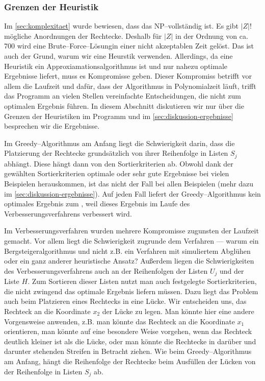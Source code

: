 \subsubsection{Grenzen der Heuristik}\label{sec:diskussion-grenzen}
Im \cref{sec:komplexitaet} wurde bewiesen, dass das \fp{} NP--vollständig ist.
Es gibt $|Z|!$ mögliche Anordnungen der Rechtecke.
Deshalb für $|Z|$ in der Ordnung von ca. 700 wird eine Brute--Force--Lösungin einer nicht
akzeptablen Zeit gelöst.
Das ist auch der Grund, warum wir eine Heurstik verwenden.
Allerdings, da eine Heuristik ein Approxiamationsalgorithmus ist und
nur nahezu optimale Ergebnisse liefert, muss es Kompromisse geben.
Dieser Kompromiss betrifft vor allem die Laufzeit und 
dafür, dass der Algorithmus in Polynomialzeit läuft, 
trifft das Programm an vielen Stellen vereinfachte Entscheidungen,
die nicht zum optimalen Ergebnis führen.
In diesem Abschnitt diskutieren wir nur über die Grenzen der Heuristiken im Programm
und im \cref{sec:diskussion-ergebnisse} besprechen wir die Ergebnisse.


Im Greedy--Algorithmus am Anfang liegt die Schwierigkeit darin, dass
die Platzierung der Rechtecke grundsätzlich von ihrer Reihenfolge 
in Listen $S_j$ abhängt. Diese hängt dann von den Sortierkriterien ab. 
Obwohl dank der gewählten Sortierkriterien optimale oder sehr gute Ergebnisse
bei vielen Beispielen herauskommen, ist das nicht der Fall bei allen Beispielen
(mehr dazu im \cref{sec:diskussion-ergebnisse}).
Auf jeden Fall liefert der Greedy--Algorithmus kein optimales Ergebnis zum ,
weil dieses Ergebnis im Laufe des Verbesserungsverfahrens verbessert wird.


Im Verbesserungsverfahren wurden mehrere Kompromisse zugunsten der Laufzeit gemacht.
Vor allem liegt die Schwierigkeit zugrunde dem Verfahren --- warum ein Bergsteigeralgorithmus
und nicht z.B. ein Verfahren mit simuliertem Abglühen oder ein ganz anderer heuristische Ansatz?
Außerdem liegen die Schwierigkeiten des Verbesserungsverfahrens auch an
der Reihenfolgen der Listen $U_j$ und der Liste $H$.
Zum Sortieren dieser Listen nutzt man auch festgelegte Sortierkriterien,
die nicht zwingend das optimale Ergebnis liefern müssen.
Dazu liegt das Problem auch beim Platzieren eines Rechtecks in eine Lücke. 
Wir entscheiden uns, das Rechteck an die Koordinate $x_2$ der Lücke zu legen.
Man könnte hier eine andere Vorgensweise anwenden, z.B. man könnte das
Rechteck an die Koordinate $x_1$ orientieren, man könnte auf eine besondere
Weise vorgehen, wenn das Rechteck deutlich kleiner ist als die Lücke, oder
man könnte die Rechtecke in darüber und darunter stehenden Streifen in Betracht ziehen.
Wie beim Greedy--Algorithmus am Anfang, hängt die Reihenfolge der Rechtecke 
beim Ausfüllen der Lücken von der Reihenfolge in Listen $S_j$ ab. 